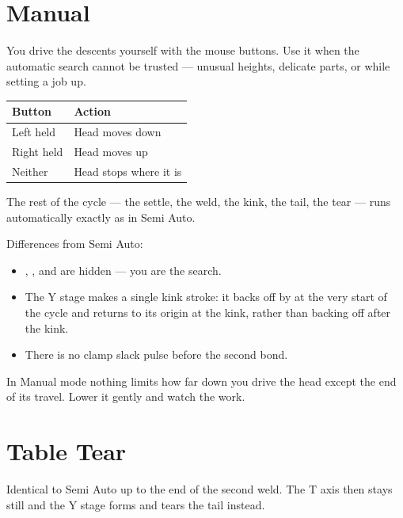\section{Manual}

You drive the descents yourself with the mouse buttons. Use it when the
automatic search cannot be trusted --- unusual heights, delicate parts, or
while setting a job up.

\begin{center}\small
\begin{tabular}{@{}L{26mm}L{95mm}@{}}
\toprule
\textbf{Button} & \textbf{Action} \\
\midrule
Left held  & Head moves down \\
Right held & Head moves up \\
Neither    & Head stops where it is \\
\bottomrule
\end{tabular}
\end{center}

The rest of the cycle --- the settle, the weld, the kink, the tail, the tear
--- runs automatically exactly as in Semi Auto.

Differences from Semi Auto:

\begin{itemize}[leftmargin=*]
\item {}, ,  and
   are hidden --- you are the search.
\item The Y stage makes a single kink stroke: it backs off by
   at the very start of the cycle and returns to its origin
  at the kink, rather than backing off after the kink.
\item There is no clamp slack pulse before the second bond.
\end{itemize}

\begin{wbwarning}
In Manual mode nothing limits how far down you drive the head except the end of
its travel. Lower it gently and watch the work.
\end{wbwarning}

\section{Table Tear}

Identical to Semi Auto up to the end of the second weld. The T axis then stays
still and the Y stage forms and tears the tail instead.

